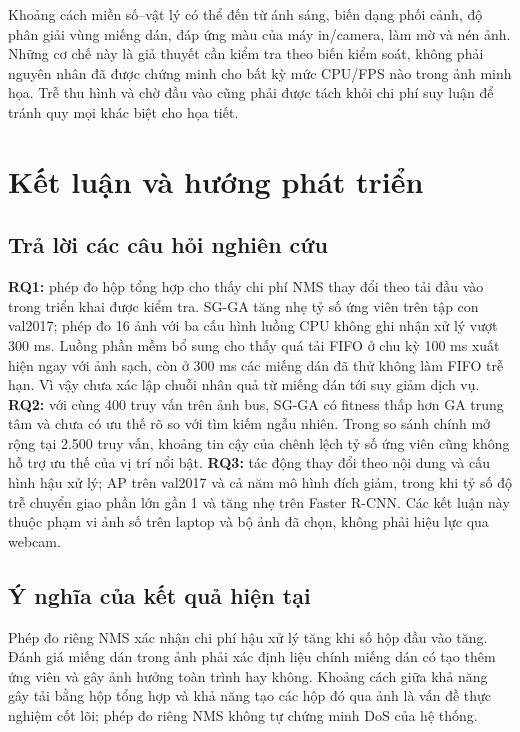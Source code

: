 \documentclass[a4paper,fleqn]{cas-dc}
\begin{document}
Khoảng cách miền số--vật lý có thể đến từ ánh sáng, biến dạng phối cảnh, độ phân giải vùng miếng dán, đáp ứng màu của máy in/camera, làm mờ và nén ảnh. Những cơ chế này là giả thuyết cần kiểm tra theo biến kiểm soát, không phải nguyên nhân đã được chứng minh cho bất kỳ mức CPU/FPS nào trong ảnh minh họa. Trễ thu hình và chờ đầu vào cũng phải được tách khỏi chi phí suy luận để tránh quy mọi khác biệt cho họa tiết.

\section{Kết luận và hướng phát triển}

\subsection{Trả lời các câu hỏi nghiên cứu}

\textbf{RQ1:} phép đo hộp tổng hợp cho thấy chi phí NMS thay đổi theo tải đầu vào trong triển khai được kiểm tra. SG-GA tăng nhẹ tỷ số ứng viên trên tập con val2017; phép đo 16 ảnh với ba cấu hình luồng CPU không ghi nhận xử lý vượt 300 ms. Luồng phần mềm bổ sung cho thấy quá tải FIFO ở chu kỳ 100 ms xuất hiện ngay với ảnh sạch, còn ở 300 ms các miếng dán đã thử không làm FIFO trễ hạn. Vì vậy chưa xác lập chuỗi nhân quả từ miếng dán tới suy giảm dịch vụ. \textbf{RQ2:} với cùng 400 truy vấn trên ảnh bus, SG-GA có fitness thấp hơn GA trung tâm và chưa có ưu thế rõ so với tìm kiếm ngẫu nhiên. Trong so sánh chính mở rộng tại 2.500 truy vấn, khoảng tin cậy của chênh lệch tỷ số ứng viên cũng không hỗ trợ ưu thế của vị trí nổi bật. \textbf{RQ3:} tác động thay đổi theo nội dung và cấu hình hậu xử lý; AP trên val2017 và cả năm mô hình đích giảm, trong khi tỷ số độ trễ chuyển giao phần lớn gần 1 và tăng nhẹ trên Faster R-CNN. Các kết luận này thuộc phạm vi ảnh số trên laptop và bộ ảnh đã chọn, không phải hiệu lực qua webcam.

\subsection{Ý nghĩa của kết quả hiện tại}

Phép đo riêng NMS xác nhận chi phí hậu xử lý tăng khi số hộp đầu vào tăng. Đánh giá miếng dán trong ảnh phải xác định liệu chính miếng dán có tạo thêm ứng viên và gây ảnh hưởng toàn trình hay không. Khoảng cách giữa khả năng gây tải bằng hộp tổng hợp và khả năng tạo các hộp đó qua ảnh là vấn đề thực nghiệm cốt lõi; phép đo riêng NMS không tự chứng minh DoS của hệ thống.
\end{document}
